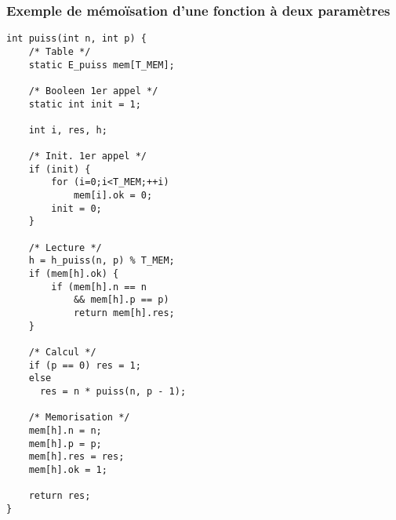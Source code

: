 \begin{frame}[fragile]
\frametitle{Exemple de mémoïsation d'une fonction à deux paramètres}
\begin{multicols}{2}
\begin{lstlisting}
int puiss(int n, int p) {
    /* Table */
    static E_puiss mem[T_MEM];

    /* Booleen 1er appel */
    static int init = 1;

    int i, res, h;

    /* Init. 1er appel */
    if (init) {
        for (i=0;i<T_MEM;++i)
            mem[i].ok = 0;
        init = 0;
    }

    /* Lecture */
    h = h_puiss(n, p) % T_MEM;
    if (mem[h].ok) {
        if (mem[h].n == n
            && mem[h].p == p)
            return mem[h].res;
    }

    /* Calcul */
    if (p == 0) res = 1;
    else
      res = n * puiss(n, p - 1);

    /* Memorisation */
    mem[h].n = n;
    mem[h].p = p;
    mem[h].res = res;
    mem[h].ok = 1;

    return res;
}
\end{lstlisting}
\end{multicols}
\end{frame}

